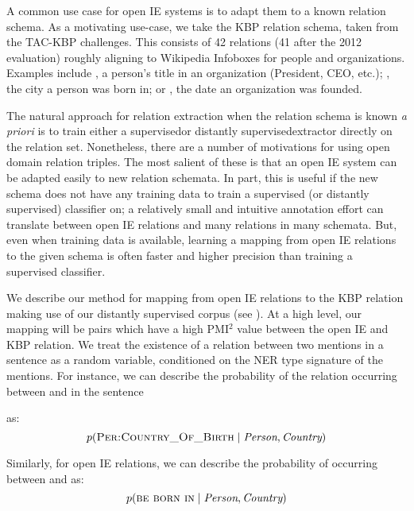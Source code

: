 A common use case for open IE systems is to adapt them to a
  known relation schema.
As a motivating use-case, we take the KBP relation schema, taken from
  the TAC-KBP challenges.
This consists of 42 relations (41 after the 2012 evaluation) roughly
  aligning to Wikipedia Infoboxes for people and organizations.
  Examples include , a person's title in an
  organization (President, CEO, etc.); , the
  city a person was born in; or , the date an organization
  was founded.

The natural approach for relation extraction when the relation
  schema is known \textit{a priori} is to train either 
  a supervised\needcite or distantly supervised\needcite extractor
  directly on the relation set.
Nonetheless, there are a number of motivations for using open domain
  relation triples.
The most salient of these is that an open IE system can be adapted
  easily to new relation schemata.
In part, this is useful if the new schema does not have any training data
  to train a supervised (or distantly supervised) classifier on; a relatively
  small and intuitive annotation effort can translate between open IE relations
  and many relations in many schemata.
But, even when training data is available, learning a mapping from open IE
  relations to the given schema is often faster and higher precision than
  training a supervised classifier.

We describe our method for mapping from open IE relations to the KBP relation
  making use of our distantly supervised corpus (see ).
At a high level, our mapping will be pairs which have a high PMI$^2$ value
  between the open IE and KBP relation.
We treat the existence of a relation between two mentions in a sentence as
  a random variable, conditioned on the NER type signature of the mentions.
For instance, we can describe the probability of the relation 
   occurring between  and
   in the sentence
\begin{center}
\end{center}
as:
\begin{equation*}
  p(\textsc{Per:Country\_Of\_Birth} \mid \textit{Person}, \textit{Country})
\end{equation*}

Similarly, for open IE relations, we can describe the probability of
   occurring between  and  as:
\begin{equation*}
  p(\textsc{be born in} \mid \textit{Person}, \textit{Country})
\end{equation*}

